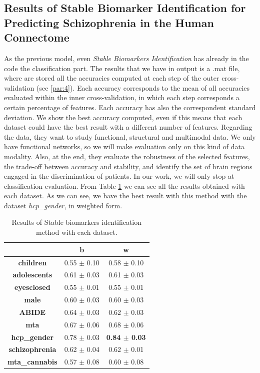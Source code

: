 \subsection{Results of Stable Biomarker Identification for Predicting Schizophrenia in the Human Connectome}

As the previous model, even \textit{Stable Biomarkers Identification} has already in the code the classification part. The results that we have in output is a .mat file, where are stored all the accuracies computed at each step of the outer cross-validation (see \ref{par:4}). Each accuracy corresponds to the mean of all accuracies evaluated within the inner cross-validation, in which each step corresponds a certain percentage of features. Each accuracy has also the correspondent standard deviation. We show the best accuracy computed, even if this means that each dataset could have the best result with a different number of features. Regarding the data, they want to study functional, structural and multimodal data. We only have functional networks, so we will make evaluation only on this kind of data modality. Also, at the end, they evaluate the robustness of the selected features, the trade-off between accuracy and stability, and identify the set of brain regions engaged in the discrimination of patients. In our work, we will only stop at classification evaluation. From Table \ref{tab:biomarkers} we can see all the results obtained with each dataset. As we can see, we have the best result with this method with the dataset \textit{hcp\_gender}, in weighted form.
\vspace{0.5cm}

\begin{table}
	\centering
	\begin{tabular}{c|c|c} 
		\toprule
		& \multicolumn{1}{c|}{b} & w                \\ 
		\midrule
		\textbf{children}      & 0.55 $\pm$ 0.10        & 0.58 $\pm$ 0.10  \\
		\textbf{adolescents}   & 0.61 $\pm$ 0.03        & 0.61 $\pm$ 0.03  \\
		\textbf{eyesclosed}    & 0.55 $\pm$ 0.01        & 0.55 $\pm$ 0.01  \\
		\textbf{male}          & 0.60 $\pm$ 0.03        & 0.60 $\pm$ 0.03  \\
		\textbf{ABIDE}         & 0.64 $\pm$ 0.03        & 0.62 $\pm$ 0.03  \\
		\textbf{mta}           & 0.67 $\pm$ 0.06        & 0.68 $\pm$ 0.06  \\
		\textbf{hcp\_gender}   & 0.78 $\pm$ 0.03        & \textbf{0.84 $\pm$ 0.03}  \\
		\textbf{schizophrenia} & 0.62 $\pm$ 0.04        & 0.62 $\pm$ 0.01  \\
		\textbf{mta\_cannabis} & 0.57 $\pm$ 0.08        & 0.60 $\pm$ 0.08 \\
		\bottomrule
	\end{tabular}
\caption{Results of Stable biomarkers identification method with each dataset.}
\label{tab:biomarkers}
\end{table}

